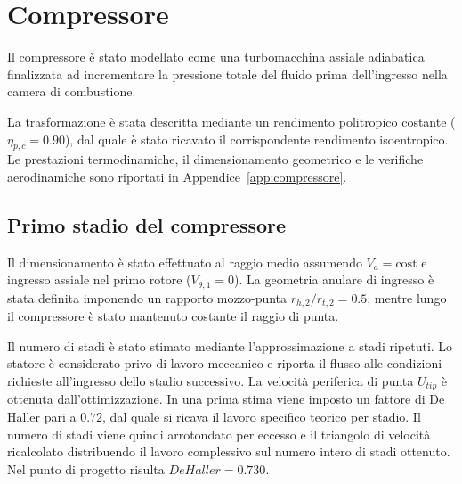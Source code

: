 \label{sec:compressore}
\section{Compressore}

Il compressore è stato modellato come una turbomacchina assiale adiabatica finalizzata ad incrementare la pressione totale del fluido prima dell'ingresso nella camera di combustione.

La trasformazione è stata descritta mediante un rendimento politropico costante ($\eta_{p,c}=0.90$), dal quale è stato ricavato il corrispondente rendimento isoentropico. Le prestazioni termodinamiche, il dimensionamento geometrico e le verifiche aerodinamiche sono riportati in Appendice~\ref{app:compressore}.

\subsection{Primo stadio del compressore}




Il dimensionamento è stato effettuato al raggio medio assumendo
$V_a=\mathrm{cost}$ e ingresso
assiale nel primo rotore ($V_{\theta,1}=0$). La geometria anulare di
ingresso è stata definita imponendo un rapporto mozzo-punta
$r_{h,2}/r_{t,2}=0.5$, mentre lungo il compressore è stato mantenuto
costante il raggio di punta.

Il numero di stadi è stato stimato mediante l'approssimazione a stadi
ripetuti. Lo statore è considerato privo di lavoro meccanico e riporta
il flusso alle condizioni richieste all'ingresso dello stadio successivo.
La velocità periferica di punta $U_{tip}$ è ottenuta dall'ottimizzazione.
In una prima stima viene imposto un fattore di De Haller pari a $0.72$,
dal quale si ricava il lavoro specifico teorico per stadio. Il numero di
stadi viene quindi arrotondato per eccesso e il triangolo di velocità
ricalcolato distribuendo il lavoro complessivo sul numero intero di
stadi ottenuto. Nel punto di progetto risulta $DeHaller=0.730$.

